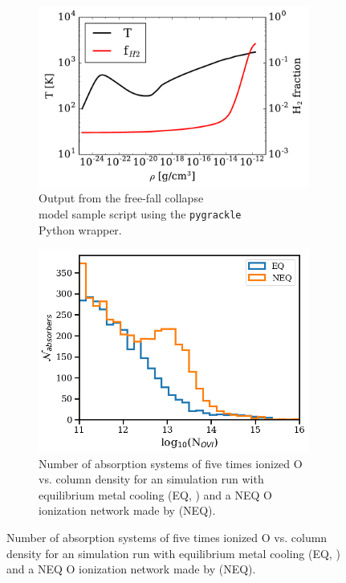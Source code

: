 \begin{figure}
\centering
\begin{subfigure}{.48\textwidth}
  \centering
  \includegraphics[width=0.98\textwidth]{figures/freefall.pdf}
  \caption{Output from the free-fall collapse\\ model sample script
    using the \texttt{pygrackle}\\Python wrapper.}
  \label{fig:freefall}
\end{subfigure}%
\begin{subfigure}{.42\textwidth}
  \centering
  \includegraphics[width=0.98\textwidth]{figures/unmatched_absorbers.png}
  \caption{Number of absorption systems of five times
    ionized O vs. column density for an \enzo{} simulation run
    with equilibrium metal cooling (EQ, \grackle{}) and a NEQ O
    ionization network made by \dengo{} (NEQ).}
  \label{fig:dengo}
\end{subfigure}%
\vspace*{-0.5\baselineskip}
\label{fig:evolve}
\vspace*{-1\baselineskip}
\end{figure}

